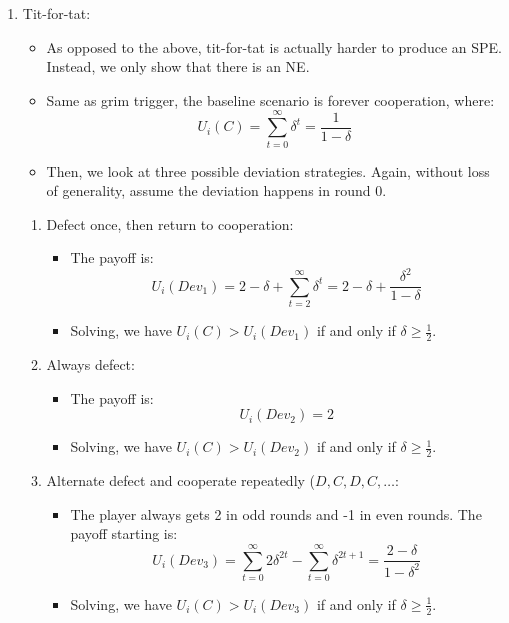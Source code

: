 \documentclass[notitlepage]{article}
\begin{document}
\begin{itemize}
\begin{enumerate}
    \item Tit-for-tat:
    \begin{itemize}
        \item As opposed to the above, tit-for-tat is actually harder to produce an SPE. Instead, we only show that there is an NE.
        \item Same as grim trigger, the baseline scenario is forever cooperation, where:
        \[
        U_i(C) = \sum_{t=0}^\infty \delta^t = \frac{1}{1-\delta}
        \]
        \item Then, we look at three possible deviation strategies. Again, without loss of generality, assume the deviation happens in round 0.
    \end{itemize}
    \begin{enumerate}
        \item Defect once, then return to cooperation:
        \begin{itemize}
            \item The payoff is:
            \[
            U_i(Dev_1) = 2 - \delta + \sum_{t=2}^\infty \delta^t = 2 - \delta + \frac{\delta^2}{1-\delta}
            \]
            \item Solving, we have \(U_i(C) > U_i(Dev_1)\) if and only if \(\delta \ge \frac{1}{2}\).
        \end{itemize}
        \newpage
        \item Always defect:
        \begin{itemize}
            \item The payoff is:
            \[
            U_i(Dev_2) = 2
            \]
            \item Solving, we have \(U_i(C) > U_i(Dev_2)\) if and only if \(\delta \ge \frac{1}{2}\).
        \end{itemize}
        \item Alternate defect and cooperate repeatedly (\(D,C,D,C,\dots\):
        \begin{itemize}
            \item The player always gets 2 in odd rounds and -1 in even rounds. The payoff starting is:
            \[
            U_i(Dev_3) = \sum_{t=0}^\infty 2\delta^{2t} - \sum_{t=0}^\infty \delta^{2t+1} = \frac{2-\delta}{1-\delta^2}
            \]
            \item Solving, we have \(U_i(C) > U_i(Dev_3)\) if and only if \(\delta \ge \frac{1}{2}\).
        \end{itemize}
    \end{enumerate}

\end{enumerate}
\end{itemize}
\end{document}
